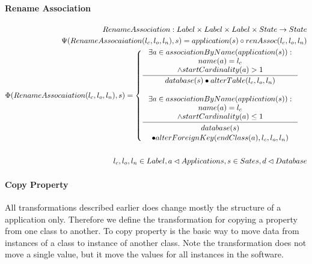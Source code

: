 \documentclass[11pt]{article}
\begin{document}
\paragraph{Rename Association}
\begin{align*}
RenameAssociation : Label \times Label \times Label \times State \rightarrow State \\
\Psi(RenameAssocaiation(l_c, l_o, l_n), s) = application(s) \circ renAssoc(l_c, l_o, l_n)\\
\Phi(RenameAssocaiation(l_c, l_o, l_n), s) = \begin{cases}
	\inference{\exists a  \in associationByName(application(s)) : \\
  name(a) = l_c \\ \wedge startCardinality(a) > 1 }{database(s) \bullet alterTable(l_c, l_o, l_n)}
 \\ \\
  \inference{\exists a  \in associationByName(application(s)) : \\
  name(a) = l_c \\ \wedge startCardinality(a) \leq 1 }{\begin{gathered}
database(s) \\ \bullet alterForeignKey(endClass(a) ,l_c, l_o, l_n)
\end{gathered}}
 \end{cases}
\\\\
l_c, l_o, l_n \in Label, a \lhd Applications, s \in Sates, d \lhd Database
\end{align*}


\paragraph{Copy Property}
All transformations described earlier does change mostly the structure of a application only. Therefore we define  the transformation for copying a property from one class to another. To copy property is the basic way to move data from instances of a class to instance of another class. Note the transformation does not move a single value, but it move the values for all instances in the software.
\end{document}
